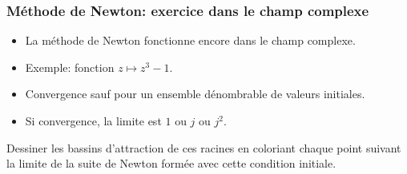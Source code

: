 \begin{frame}
  \frametitle{Méthode de Newton: exercice dans le champ complexe}
\begin{itemize}
  \item La méthode de Newton fonctionne encore dans le champ complexe.
  \item Exemple: fonction $z\mapsto z^3 -1$.
  \item Convergence sauf pour un ensemble dénombrable de valeurs initiales.
  \item Si convergence, la limite est $1$ ou $j$ ou $j^2$.
\end{itemize}

Dessiner les bassins d'attraction de ces racines en coloriant chaque point suivant la limite de la suite de Newton formée avec cette condition initiale.
\end{frame}



